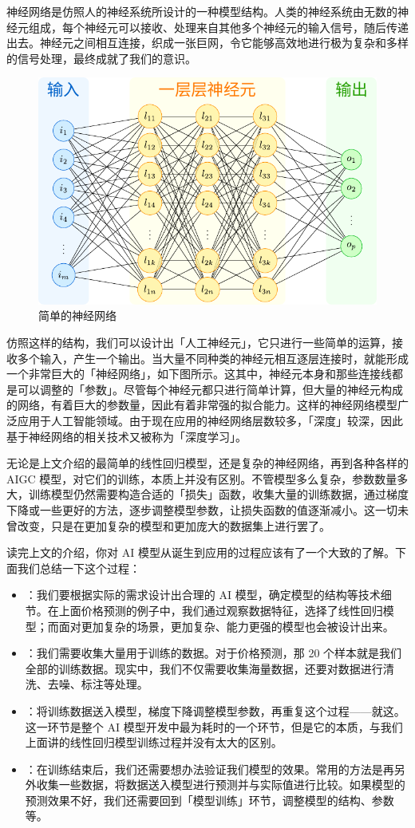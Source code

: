 神经网络是仿照人的神经系统所设计的一种模型结构。人类的神经系统由无数的神经元组成，每个神经元可以接收、处理来自其他多个神经元的输入信号，随后传递出去。神经元之间相互连接，织成一张巨网，令它能够高效地进行极为复杂和多样的信号处理，最终成就了我们的意识。

\begin{figure}[htb!]
  \centering
  \includegraphics[width=.5\textwidth]{assets/surpass/NeuroNetwork.pdf}
  \caption{简单的神经网络}
  \label{fig:NeuroNetwork}
\end{figure}

仿照这样的结构，我们可以设计出「人工神经元」，它只进行一些简单的运算，接收多个输入，产生一个输出。当大量不同种类的神经元相互逐层连接时，就能形成一个非常巨大的「神经网络」，如下图所示。这其中，神经元本身和那些连接线都是可以调整的「参数」。尽管每个神经元都只进行简单计算，但大量的神经元构成的网络，有着巨大的参数量，因此有着非常强的拟合能力。这样的神经网络模型广泛应用于人工智能领域。由于现在应用的神经网络层数较多，「深度」较深，因此基于神经网络的相关技术又被称为「深度学习」。

无论是上文介绍的最简单的线性回归模型，还是复杂的神经网络，再到各种各样的 AIGC 模型，对它们的训练，本质上并没有区别。不管模型多么复杂，参数数量多大，训练模型仍然需要构造合适的「损失」函数，收集大量的训练数据，通过梯度下降或一些更好的方法，逐步调整模型参数，让损失函数的值逐渐减小。这一切未曾改变，只是在更加复杂的模型和更加庞大的数据集上进行罢了。

读完上文的介绍，你对 AI 模型从诞生到应用的过程应该有了一个大致的了解。下面我们总结一下这个过程：

\begin{itemize}
  \item {}：我们要根据实际的需求设计出合理的 AI 模型，确定模型的结构等技术细节。在上面价格预测的例子中，我们通过观察数据特征，选择了线性回归模型；而面对更加复杂的场景，更加复杂、能力更强的模型也会被设计出来。
  \item {}：我们需要收集大量用于训练的数据。对于价格预测，那 20 个样本就是我们全部的训练数据。现实中，我们不仅需要收集海量数据，还要对数据进行清洗、去噪、标注等处理。
  \item {}：将训练数据送入模型，梯度下降调整模型参数，再重复这个过程——就这。这一环节是整个 AI 模型开发中最为耗时的一个环节，但是它的本质，与我们上面讲的线性回归模型训练过程并没有太大的区别。
  \item {}：在训练结束后，我们还需要想办法验证我们模型的效果。常用的方法是再另外收集一些数据，将数据送入模型进行预测并与实际值进行比较。如果模型的预测效果不好，我们还需要回到「模型训练」环节，调整模型的结构、参数等。
\end{itemize}

